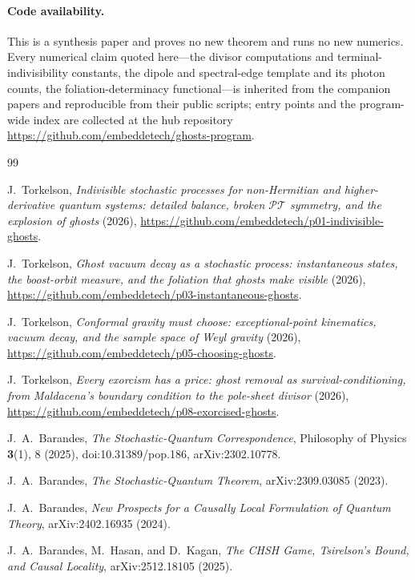 \documentclass[11pt]{article}
\newcommand{\PT}{\mathcal{PT}}
\theoremstyle{remark}
\begin{document}
\paragraph{Code availability.} This is a synthesis paper and proves
no new theorem and runs no new numerics. Every numerical claim quoted
here---the divisor computations and terminal-indivisibility
constants, the dipole and spectral-edge template and its photon
counts, the foliation-determinacy functional---is inherited from the
companion papers and reproducible from their public scripts; entry
points and the program-wide index are collected at the hub repository
\url{https://github.com/embeddetech/ghosts-program}.

\begin{thebibliography}{99}\small

 J.~Torkelson,
\emph{Indivisible stochastic processes for non-Hermitian and
higher-derivative quantum systems: detailed balance, broken $\PT$
symmetry, and the explosion of ghosts} (2026),
\url{https://github.com/embeddetech/p01-indivisible-ghosts}.

 J.~Torkelson,
\emph{Ghost vacuum decay as a stochastic process: instantaneous
states, the boost-orbit measure, and the foliation that ghosts make
visible} (2026),
\url{https://github.com/embeddetech/p03-instantaneous-ghosts}.

 J.~Torkelson,
\emph{Conformal gravity must choose: exceptional-point kinematics,
vacuum decay, and the sample space of Weyl gravity} (2026),
\url{https://github.com/embeddetech/p05-choosing-ghosts}.

 J.~Torkelson,
\emph{Every exorcism has a price: ghost removal as
survival-conditioning, from Maldacena's boundary condition to the
pole-sheet divisor} (2026),
\url{https://github.com/embeddetech/p08-exorcised-ghosts}.

 J.~A.~Barandes,
\emph{The Stochastic-Quantum Correspondence},
Philosophy of Physics \textbf{3}(1), 8 (2025),
doi:10.31389/pop.186, arXiv:2302.10778.

 J.~A.~Barandes,
\emph{The Stochastic-Quantum Theorem}, arXiv:2309.03085 (2023).

 J.~A.~Barandes,
\emph{New Prospects for a Causally Local Formulation of Quantum
Theory}, arXiv:2402.16935 (2024).

 J.~A.~Barandes, M.~Hasan, and D.~Kagan,
\emph{The CHSH Game, Tsirelson's Bound, and Causal Locality},
arXiv:2512.18105 (2025).


\end{thebibliography}
\end{document}
